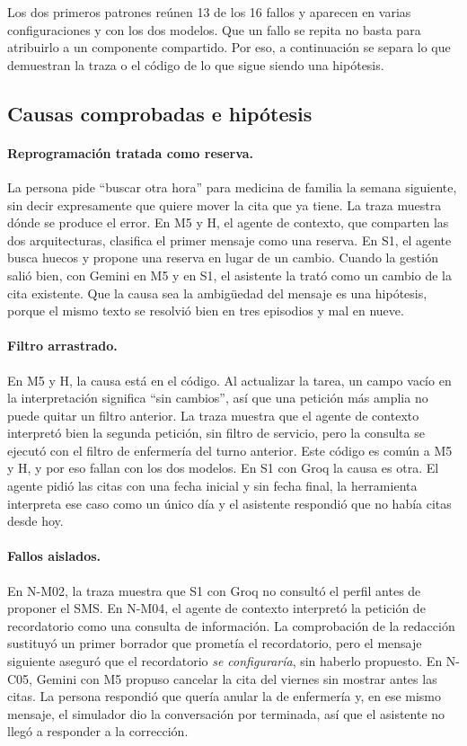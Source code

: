 Los dos primeros patrones reúnen 13 de los 16 fallos y aparecen en varias
configuraciones y con los dos modelos. Que un fallo se repita no basta para
atribuirlo a un componente compartido. Por eso, a continuación se separa lo que
demuestran la traza o el código de lo que sigue siendo una hipótesis.

\subsection{Causas comprobadas e hipótesis}

\paragraph{Reprogramación tratada como reserva.}
La persona pide \enquote{buscar otra hora} para medicina de familia la semana
siguiente, sin decir expresamente que quiere mover la cita que ya tiene. La
traza muestra dónde se produce el error. En M5 y H, el agente de contexto, que
comparten las dos arquitecturas, clasifica el primer mensaje como una reserva.
En S1, el agente busca huecos y propone una reserva en lugar de un cambio.
Cuando la gestión salió bien, con Gemini en M5 y en S1, el asistente la trató
como un cambio de la cita existente. Que la causa sea la ambigüedad del mensaje
es una hipótesis, porque el mismo texto se resolvió bien en tres episodios y
mal en nueve.

\paragraph{Filtro arrastrado.}
En M5 y H, la causa está en el código. Al actualizar la tarea, un campo vacío
en la interpretación significa \enquote{sin cambios}, así que una petición más
amplia no puede quitar un filtro anterior. La traza muestra que el agente de
contexto interpretó bien la segunda petición, sin filtro de servicio, pero la
consulta se ejecutó con el filtro de enfermería del turno anterior. Este código
es común a M5 y H, y por eso fallan con los dos modelos. En S1 con Groq la causa
es otra. El agente pidió las citas con una fecha inicial y sin fecha final, la
herramienta interpreta ese caso como un único día y el asistente respondió que
no había citas desde hoy.

\paragraph{Fallos aislados.}
En N-M02, la traza muestra que S1 con Groq no consultó el perfil antes de
proponer el SMS. En N-M04, el agente de contexto interpretó la petición de
recordatorio como una consulta de información. La comprobación de la redacción
sustituyó un primer borrador que prometía el recordatorio, pero el mensaje
siguiente aseguró que el recordatorio \emph{se configuraría}, sin haberlo
propuesto. En N-C05, Gemini con M5 propuso cancelar la cita del viernes sin
mostrar antes las citas. La persona respondió que quería anular la de
enfermería y, en ese mismo mensaje, el simulador dio la conversación por
terminada, así que el asistente no llegó a responder a la corrección.

